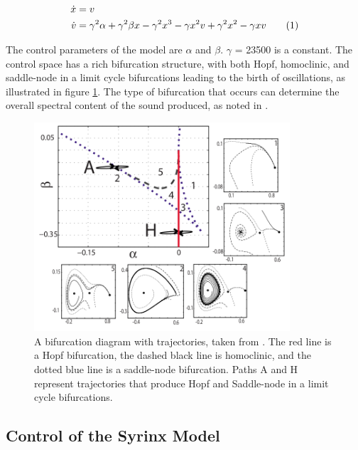 \documentclass{article} %
\newcommand\numberthis{\addtocounter{equation}{1}\tag{\theequation}}
\begin{document}
\begin{align*}
\dot{x}&=\begin{aligned}v\end{aligned} \\
\dot{v}&=\begin{aligned}\gamma^2 \alpha + \gamma^2 \beta x - \gamma^2 x^3 - \gamma x^2 v + \gamma^2 x^2 - \gamma x v\end{aligned} \numberthis \label{eq_oscillator}
\end{align*}

The control parameters of the model are $\alpha$ and $\beta$. $\gamma$ = 23500 is a constant.
The control space has a rich bifurcation structure, with both Hopf, homoclinic, and saddle-node
in a limit cycle bifurcations leading to the birth of oscillations, as illustrated in figure
\ref{fig:bifurcations}. The type of bifurcation that occurs can determine the overall spectral
content of the sound produced, as noted in \cite{Sitt2010}.

\begin{figure}[h]
\centering
\includegraphics[width=0.85\textwidth]{images/bifurcations_and_trajectories.png}
\caption{A bifurcation diagram with trajectories, taken from \cite{Sitt2010}.
         The red line is a Hopf bifurcation, the dashed black line is homoclinic,
         and the dotted blue line is a saddle-node bifurcation. Paths A and H represent
         trajectories that produce Hopf and Saddle-node in a limit cycle bifurcations.}
\label{fig:bifurcations}
\end{figure}


\subsection{Control of the Syrinx Model}
\end{document}
